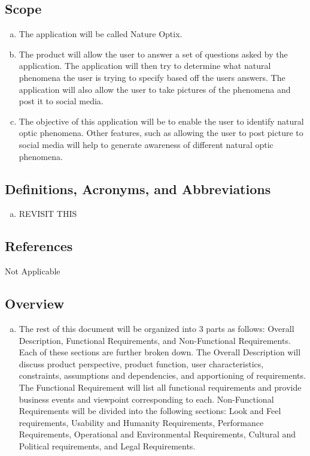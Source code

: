 \documentclass[]{article}
\begin{document}
\subsection{Scope}
\label{sub:scope}
\begin{enumerate}[a)]
	\item The application will be called Nature Optix.
	\item The product will allow the user to answer a set of questions asked by the application. The application will then try to determine what natural phenomena the user is trying to specify based off the users answers. The application will also allow the user to take pictures of the phenomena and post it to social media. 
	\item The objective of this application will be to enable the user to identify natural optic phenomena. Other features, such as allowing the user to post picture to social media will help to generate awareness of different natural optic phenomena. 
\end{enumerate}

\subsection{Definitions, Acronyms, and Abbreviations}
\label{sub:definitions_acronyms_and_abbreviations}
\begin{enumerate}[a)]
	\item REVISIT THIS
\end{enumerate}

\subsection{References}
\label{sub:references}
Not Applicable

\subsection{Overview}
\label{sub:overview}
\begin{enumerate}[a)]
	\item The rest of this document will be organized into 3 parts as follows: Overall Description, Functional Requirements, and Non-Functional Requirements. Each of these sections are further broken down. The Overall Description will discuss product perspective, product function, user characteristics, constraints, assumptions and dependencies, and apportioning of requirements. The Functional Requirement will list all functional requirements and provide business events and viewpoint corresponding to each. Non-Functional Requirements will be divided into the following sections: Look and Feel requirements, Usability and Humanity Requirements, Performance Requirements, Operational and Environmental Requirements, Cultural and Political requirements, and Legal Requirements. 
\end{enumerate}
\end{document}
